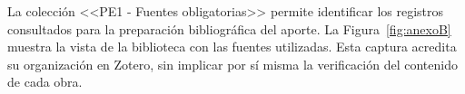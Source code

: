 \documentclass[onecolumn,12pt]{IEEEtran}
\begin{document}
	La colecci\'on <<PE1 - Fuentes obligatorias>> permite identificar los registros consultados para la preparaci\'on bibliogr\'afica del aporte. La Figura~\ref{fig:anexoB} muestra la vista de la biblioteca con las fuentes utilizadas. Esta captura acredita su organizaci\'on en Zotero, sin implicar por s\'i misma la verificaci\'on del contenido de cada obra.
	
	
	
\end{document}
